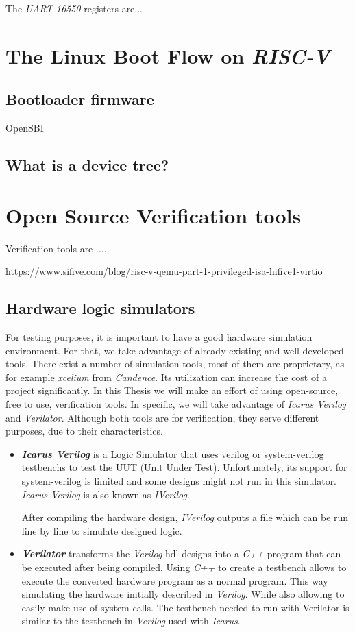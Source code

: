 The \textit{UART 16550} registers are...

\section{The Linux Boot Flow on \textit{RISC-V}}
\label{section:linux_boot_flow}
\subsection{Bootloader firmware}
OpenSBI
\subsection{What is a device tree?}

\section{Open Source Verification tools}
\label{section:verification_tools}
Verification tools are ....

https://www.sifive.com/blog/risc-v-qemu-part-1-privileged-isa-hifive1-virtio

\subsection{Hardware logic simulators}
For testing purposes, it is important to have a good hardware simulation environment. For that, we take advantage of already existing and well-developed tools. There exist a number of simulation tools, most of them are proprietary, as for example \textit{xcelium} from \textit{Candence}. Its utilization can increase the cost of a project significantly. In this Thesis we will make an effort of using open-source, free to use, verification tools. In specific, we will take advantage of \textit{Icarus Verilog} and \textit{Verilator}. Although both tools are for verification, they serve different purposes, due to their characteristics.

\begin{itemize}
    \item \textbf{\textit{Icarus Verilog}} is a Logic Simulator that uses verilog or system-verilog testbenchs to test the UUT (Unit Under Test). Unfortunately, its support for system-verilog is limited and some designs might not run in this simulator. \textit{Icarus Verilog} is also known as \textit{IVerilog}.
    
    After compiling the hardware design, \textit{IVerilog} outputs a file which can be run line by line to simulate designed logic.
    
    \item \textbf{\textit{Verilator}} transforms the \textit{Verilog} \acrshort{hdl} designs into a \textit{C++} program that can be executed after being compiled. Using \textit{C++} to create a testbench allows to execute the converted hardware program as a normal program. This way simulating the hardware initially described in \textit{Verilog}. While also allowing to easily make use of system calls. The testbench needed to run with Verilator is similar to the testbench in \textit{Verilog} used with \textit{Icarus}.
\end{itemize}

